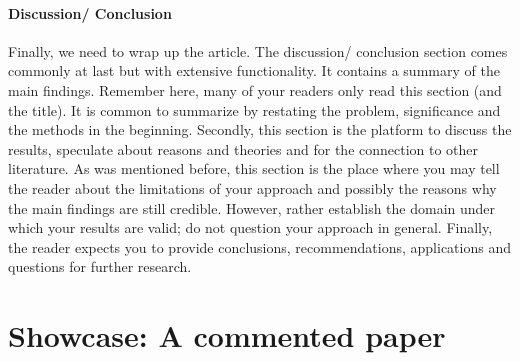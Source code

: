 \documentclass{tufte-book}
\begin{document}
\paragraph{Discussion/ Conclusion}
Finally, we need to wrap up the article.%
The discussion/ conclusion section comes commonly at last but with extensive functionality. It contains a summary of the main findings. Remember here, many of your readers only read this section (and the title). It is common to summarize by restating the problem, significance and the methods in the beginning. Secondly, this section is the platform to discuss the results, speculate about reasons and theories and for the connection to other literature.
As was mentioned before, this section is the place where you may tell the reader about the limitations of your approach and possibly the reasons why the main findings are still credible. However, rather establish the domain under which your results are valid; do not question your approach in general. Finally, the reader expects you to provide conclusions, recommendations, applications and questions for further research.\\

\section{Showcase: A commented paper}
\end{document}
